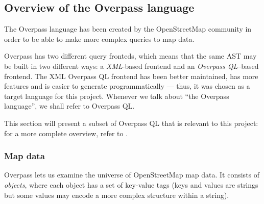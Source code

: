 \documentclass[main.tex]{subfiles}
\begin{document}
\subsection{Overview of the Overpass language}
The Overpass language \cite{overpass} has been created by the OpenStreetMap
community in order to be able to make more complex queries to map data.

Overpass has two different query fronteds, which means that the same AST
may be built in two different ways: a \emph{XML}-based frontend and an
\emph{Overpass QL}--based frontend.
The XML Overpass QL frontend has been better maintained, has more features
and is easier to generate programmatically --- thus, it was chosen as a target
language for this project. Whenever we talk about ``the Overpass language'',
we shall refer to Overpass QL.

This section will present a subset of Overpass QL that is relevant to this project: for a
more complete overview, refer to \cite{overpassql}.

\subsubsection{Map data}
Overpass lets us examine the universe of OpenStreetMap map data.
It consists of \emph{objects}, where each object has a set of key-value
tags (keys and values are strings but some values may encode a more complex
structure within a string).
\end{document}
